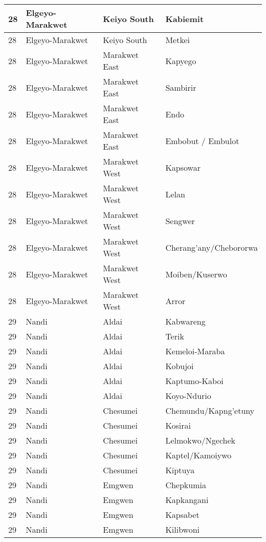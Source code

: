 \begin{table}[!ht]
\begin{tabular}{|l|l|l|l|}
        28 & Elgeyo-Marakwet & Keiyo South & Kabiemit \\ \hline
        28 & Elgeyo-Marakwet & Keiyo South & Metkei \\ \hline
        28 & Elgeyo-Marakwet & Marakwet East & Kapyego \\ \hline
        28 & Elgeyo-Marakwet & Marakwet East & Sambirir \\ \hline
        28 & Elgeyo-Marakwet & Marakwet East & Endo \\ \hline
        28 & Elgeyo-Marakwet & Marakwet East & Embobut / Embulot \\ \hline
        28 & Elgeyo-Marakwet & Marakwet West & Kapsowar \\ \hline
        28 & Elgeyo-Marakwet & Marakwet West & Lelan \\ \hline
        28 & Elgeyo-Marakwet & Marakwet West & Sengwer \\ \hline
        28 & Elgeyo-Marakwet & Marakwet West & Cherang’any/Chebororwa \\ \hline
        28 & Elgeyo-Marakwet & Marakwet West & Moiben/Kuserwo \\ \hline
        28 & Elgeyo-Marakwet & Marakwet West & Arror \\ \hline
        29 & Nandi & Aldai & Kabwareng \\ \hline
        29 & Nandi & Aldai & Terik \\ \hline
        29 & Nandi & Aldai & Kemeloi-Maraba \\ \hline
        29 & Nandi & Aldai & Kobujoi \\ \hline
        29 & Nandi & Aldai & Kaptumo-Kaboi \\ \hline
        29 & Nandi & Aldai & Koyo-Ndurio \\ \hline
        29 & Nandi & Chesumei & Chemundu/Kapng’etuny \\ \hline
        29 & Nandi & Chesumei & Kosirai \\ \hline
        29 & Nandi & Chesumei & Lelmokwo/Ngechek \\ \hline
        29 & Nandi & Chesumei & Kaptel/Kamoiywo \\ \hline
        29 & Nandi & Chesumei & Kiptuya \\ \hline
        29 & Nandi & Emgwen & Chepkumia \\ \hline
        29 & Nandi & Emgwen & Kapkangani \\ \hline
        29 & Nandi & Emgwen & Kapsabet \\ \hline
        29 & Nandi & Emgwen & Kilibwoni \\ \hline

\end{tabular}
\end{table}
